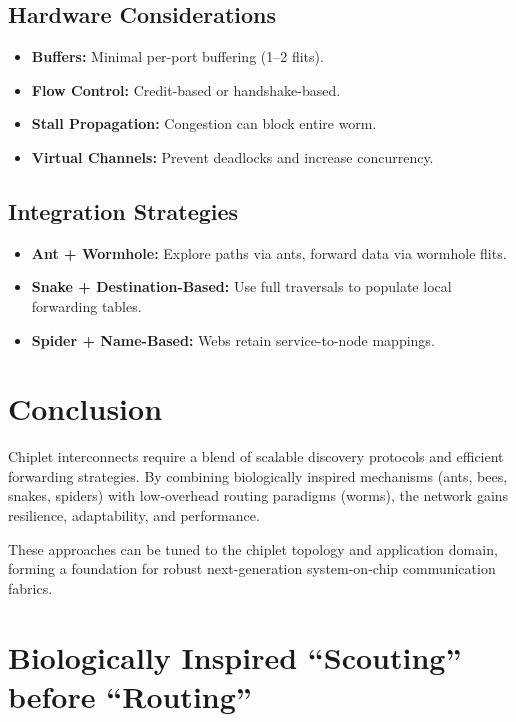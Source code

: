 \documentclass[../OAE-SPEC-MAIN.tex]{subfiles}
\begin{document}
\subsection{Hardware Considerations}

\begin{itemize}
\item \textbf{Buffers:} Minimal per-port buffering (1--2 flits).
\item \textbf{Flow Control:} Credit-based or handshake-based.
\item \textbf{Stall Propagation:} Congestion can block entire worm.
\item \textbf{Virtual Channels:} Prevent deadlocks and increase concurrency.
\end{itemize}

\subsection{Integration Strategies}

\begin{itemize}
\item \textbf{Ant + Wormhole:} Explore paths via ants, forward data via wormhole flits.
\item \textbf{Snake + Destination-Based:} Use full traversals to populate local forwarding tables.
\item \textbf{Spider + Name-Based:} Webs retain service-to-node mappings.
\end{itemize}

\section{Conclusion}

Chiplet interconnects require a blend of scalable discovery protocols and efficient forwarding strategies. By combining biologically inspired mechanisms (ants, bees, snakes, spiders) with low-overhead routing paradigms (worms), the network gains resilience, adaptability, and performance.

These approaches can be tuned to the chiplet topology and application domain, forming a foundation for robust next-generation system-on-chip communication fabrics.




\clearpage


\section{Biologically Inspired ``Scouting'' before ``Routing''}
%
\end{document}
